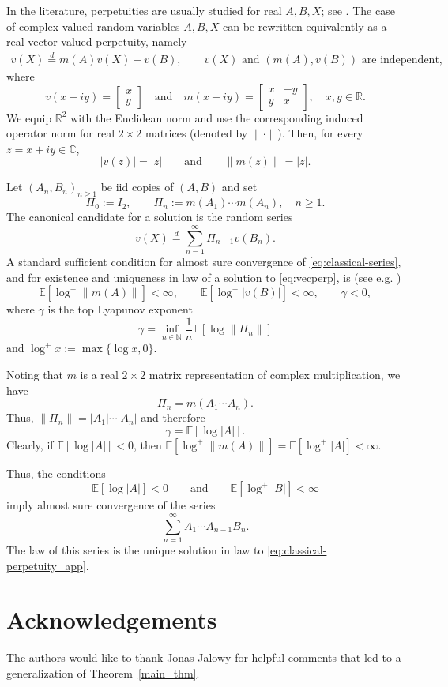 \documentclass[a4paper,11pt]{amsart}
\numberwithin{equation}{section}
\newcommand{\C}{\mathbb{C}}
\newcommand{\N}{\mathbb{N}}
\newcommand{\E}{\mathbb{E}}
\newcommand{\R}{\mathbb{R}}
\begin{document}
In the literature, perpetuities are usually studied for real $A,B,X$; see \cite{BurBook16}. The case of complex-valued random variables $A,B,X$ can be rewritten equivalently as a real-vector-valued perpetuity, namely
\begin{align}\label{eq:vecperp}
v(X) \stackrel{d}{=} m(A) v(X)+v(B),\qquad v(X)\mbox{ and }(m(A), v(B))\mbox{ are independent},
\end{align}
where 
\[
v(x+i y) = \begin{bmatrix} x \\ y \end{bmatrix}\quad\mbox{and}\quad m(x+i y) = 
 \begin{bmatrix}
x & -y \\ y & x
 \end{bmatrix},\quad x,y\in\R.
 \]
We equip $\R^2$ with the Euclidean norm and use the corresponding induced operator norm for real \(2\times2\) matrices (denoted by $\|\cdot\|$). Then, for every $z=x+iy\in\C$,
\[
|v(z)|=|z|
\qquad\mbox{and}\qquad
\|m(z)\|=|z|.
\]
 
Let $(A_n,B_n)_{n\ge1}$ be iid copies of $(A,B)$ and set
\[
\Pi_0:=I_2,
\qquad
\Pi_n:=m(A_1)\cdots m(A_n),\quad n\ge1.
\]
The canonical candidate for a solution is the random series
\begin{equation}\label{eq:classical-series}
v(X) \stackrel{d}{=} \sum_{n=1}^\infty \Pi_{n-1}v(B_n).
\end{equation}
A standard sufficient condition for almost sure convergence of \eqref{eq:classical-series}, and for existence and uniqueness in law of a solution to \eqref{eq:vecperp}, is  (see e.g. \cite[Theorem 4.1.4]{BurBook16})
\begin{equation}\label{eq:classical-existence}
\E[\log^+ \| m(A)\|]<\infty,
\qquad
\E[\log^+ |v(B)|]<\infty,\qquad \gamma<0,
\end{equation}
where $\gamma$ is the top Lyapunov exponent 
\[
\gamma = \inf_{n\in\N} \frac1n\E[\log \|\Pi_n\|]
\]
and $\log^+ x:=\max\{\log x,0\}$.  

Noting that $m$ is a real $2\times 2$ matrix representation of complex multiplication, we have
\[
\Pi_n = m(A_1 \cdots A_n).
\]
Thus,  $\|\Pi_n\| = |A_1| \cdots|A_n|$ and therefore 
\[
\gamma=\E[\log |A|].
\]
Clearly, if $\E[\log|A|]<0$, then $\E[\log^+ \| m(A)\|] = \E[\log^+|A|]<\infty$. 

Thus, the conditions  
\[
\E[\log |A|]<0
\qquad\mbox{and}\qquad
\E[\log^+|B|]<\infty
\]
imply almost sure convergence of the series 
\[
\sum_{n=1}^\infty A_1\cdots A_{n-1}B_n.
\]
The law of this series is the unique solution in law to 
\eqref{eq:classical-perpetuity_app}.


\section*{Acknowledgements}
The authors would like to thank Jonas Jalowy for helpful comments that led to a generalization of Theorem~\ref{main_thm}.



\end{document}

